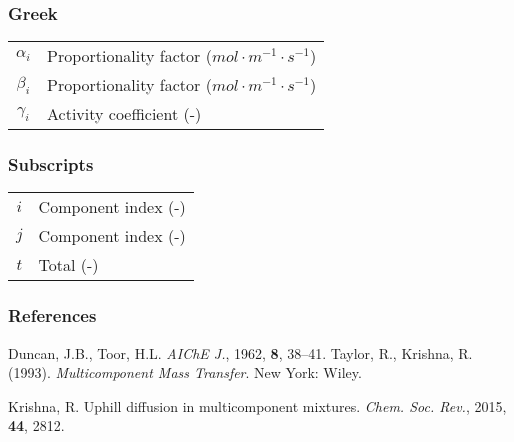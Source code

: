 \documentclass[twocolumn]{article}
\begin{document}
\subsubsection*{Greek}
\begin{table}[H]
    \begin{tabular}{c l} 
      $\alpha_i$ & Proportionality factor ($mol \cdot m^{-1} \cdot s^{-1}$) \\
      $\beta_i$ & Proportionality factor ($mol \cdot m^{-1} \cdot s^{-1}$) \\
      $\gamma_i$ & Activity coefficient (-) \\
    \end{tabular}
\end{table}
\subsubsection*{Subscripts}
\begin{table}[H]
    \begin{tabular}{c l} 
      $i$ & Component index (-)\\
      $j$ & Component index (-) \\
      $t$ & Total (-) \\
    \end{tabular}
\end{table}

\subsubsection*{References}
\renewcommand{\refname}{}
\begin{thebibliography}{2}
\label{eqn:my_ref_2}
Duncan, J.B., Toor, H.L. \textit{AIChE J.}, 1962, \textbf{8}, 38–41.
\label{eqn:my_ref_1}
Taylor, R., Krishna, R. (1993). \textit{Multicomponent Mass Transfer}. New York: Wiley.

\label{eqn:my_ref_3}
Krishna, R. Uphill diffusion in multicomponent mixtures. \textit{Chem. Soc. Rev.}, 2015, \textbf{44}, 2812.

\end{thebibliography}
\end{document}
